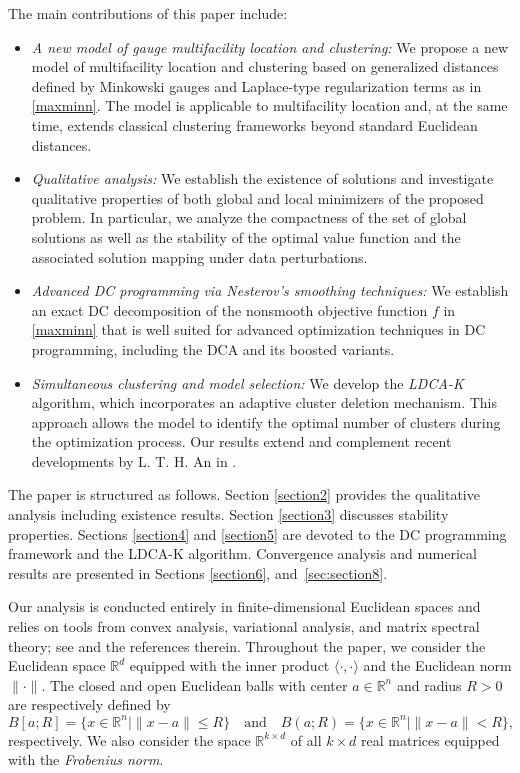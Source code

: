 \documentclass[11pt]{article}
\theoremstyle{definition}
\newcommand{\1}{\mathbf{1}}
\begin{document}
The main contributions of this paper include:
\begin{itemize}
    \item {\em A new model of gauge multifacility location and clustering:} We propose a new model of multifacility location and clustering based on generalized distances defined by Minkowski gauges and Laplace-type regularization terms as in \eqref{maxminn}. The model is applicable to multifacility location and, at the same time, extends classical clustering frameworks beyond standard Euclidean distances.
    \item {\em Qualitative analysis:} We establish the existence of solutions and investigate qualitative properties of both global and local minimizers of the proposed problem. In particular, we analyze the compactness of the set of global solutions as well as the stability of the optimal value function and the associated solution mapping under data perturbations.
    \item {\em Advanced DC programming via Nesterov's smoothing techniques:} We establish an exact DC decomposition of the nonsmooth objective function $f$ in \eqref{maxminn} that is well suited for advanced optimization techniques in DC programming, including the DCA and its boosted variants.
    \item {\em Simultaneous clustering and model selection:} We develop the \textit{LDCA-K} algorithm, which incorporates an adaptive cluster deletion mechanism. This approach allows the model to identify the optimal number of clusters during the optimization process. Our results extend and complement recent developments by L. T. H. An in \cite{An2025}.
\end{itemize}



The paper is structured as follows. Section \ref{section2} provides the qualitative analysis including existence results. Section \ref{section3} discusses stability properties. Sections \ref{section4} and \ref{section5} are devoted to the DC programming framework and the LDCA-K algorithm. Convergence analysis and numerical results are presented in Sections \ref{section6}, %
and~\ref{sec:section8}.


 Our analysis is conducted entirely in finite-dimensional Euclidean spaces and relies on tools from convex analysis, variational analysis, and matrix spectral theory; see \cite{boyd2004convex,mordukhovich2023easy,rockafellar1970convex,rockafellar2009variational} and the references therein. Throughout the paper, we consider the Euclidean space $\mathbb{R}^d$  equipped with the inner product $\langle \cdot, \cdot\rangle$ and the Euclidean norm $\|\cdot\|$. The closed and open Euclidean balls with center $a \in \mathbb{R}^n$ and radius $R > 0$ are respectively defined by $$B[a; R] = \{x \in \mathbb{R}^n \mid \|x-a\| \le R\}\quad\text{and}\quad B(a; R) = \{x \in \mathbb{R}^n \mid \|x-a\| < R\},$$ respectively. We also consider the space $\mathbb{R}^{k\times d}$ of all $k\times d$ real matrices equipped with the {\em Frobenius norm}.
\end{document}

